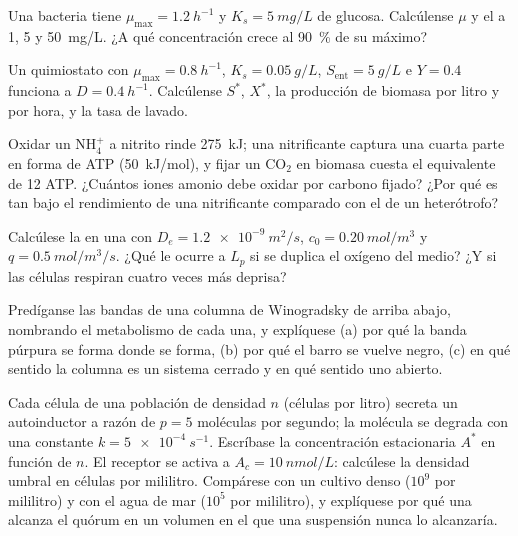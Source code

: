 \begin{exercise}[$\star\star$]\label{exo:b2:microbial-metabolism:6}
Una bacteria tiene $\mu_{\max} = \qty{1.2}{h^{-1}}$ y $K_s =
\qty{5}{mg/L}$ de glucosa. Calcúlense $\mu$ y el  a
1, 5 y \qty{50}{mg/L}. ¿A qué concentración crece al \qty{90}{\%} de su
máximo?
\end{exercise}

\begin{exercise}[$\star\star$]\label{exo:b2:microbial-metabolism:7}
Un quimiostato con $\mu_{\max} = \qty{0.8}{h^{-1}}$, $K_s =
\qty{0.05}{g/L}$, $S_{\text{ent}} = \qty{5}{g/L}$ e $Y = 0.4$ funciona a
$D = \qty{0.4}{h^{-1}}$. Calcúlense $S^*$, $X^*$, la producción de
biomasa por litro y por hora, y la tasa de lavado.
\end{exercise}

\begin{exercise}[$\star\star$]\label{exo:b2:microbial-metabolism:8}
Oxidar un $\mathrm{NH_4^+}$ a nitrito rinde \qty{275}{kJ}; una
nitrificante captura una cuarta parte en forma de ATP (\qty{50}{kJ/mol}),
y fijar un $\mathrm{CO_2}$ en biomasa cuesta el equivalente de 12
ATP. ¿Cuántos iones amonio debe oxidar por carbono fijado? ¿Por qué es
tan bajo el rendimiento de una nitrificante comparado con el de un
heterótrofo?
\end{exercise}

\begin{exercise}[$\star\star$]\label{exo:b2:microbial-metabolism:9}
Calcúlese la  en una 
con $D_e =
\qty{1.2e-9}{m^2/s}$, $c_0 = \qty{0.20}{mol/m^3}$ y $q =
\qty{0.5}{mol/m^3/s}$. ¿Qué le ocurre a $L_p$ si se duplica el oxígeno
del medio? ¿Y si las células respiran cuatro veces más deprisa?
\end{exercise}

\begin{exercise}[$\star\star\star$]\label{exo:b2:microbial-metabolism:10}
Predíganse las bandas de una columna de Winogradsky de arriba abajo,
nombrando el metabolismo de cada una, y explíquese (a) por qué la banda
púrpura se forma donde se forma, (b) por qué el barro se vuelve negro,
(c) en qué sentido la columna es un sistema cerrado y en qué sentido uno
abierto.
\end{exercise}

\begin{exercise}[$\star\star\star$]\label{exo:b2:microbial-metabolism:11}
Cada célula de una población de densidad $n$ (células por litro) secreta
un autoinductor a razón de $p = 5$ moléculas por segundo; la molécula se
degrada con una constante $k = \qty{5e-4}{s^{-1}}$. Escríbase la
concentración estacionaria $A^*$ en función de $n$. El receptor se activa
a $A_c = \qty{10}{nmol/L}$: calcúlese la densidad umbral en células
por mililitro. Compárese con un cultivo denso ($10^{9}$ por
mililitro) y con el agua de mar ($10^{5}$ por mililitro), y explíquese
por qué una  alcanza el quórum en un volumen en el que una
suspensión nunca lo alcanzaría.
\end{exercise}

